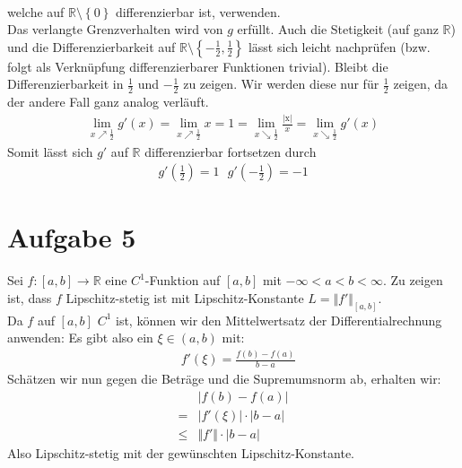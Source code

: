 \documentclass{scrreprt}
\newcommand{\RR}{\mathbb{R}}
\newcommand{\curly}[1]{\left\lbrace#1\right\rbrace}
\newcommand{\abs}[1]{\left\vert#1\right\vert}
\begin{document}
\begin{enumerate}[(a)]
\begin{align*}
    \end{align*}
    welche auf $\RR\setminus\curly{0}$ differenzierbar ist, verwenden.\\
    Das verlangte Grenzverhalten wird von $g$ erfüllt. Auch die Stetigkeit (auf ganz $\RR$) und die Differenzierbarkeit auf $\RR\setminus \curly{-\frac{1}{2}, \frac{1}{2}}$ lässt sich leicht nachprüfen (bzw. folgt als Verknüpfung differenzierbarer Funktionen trivial). Bleibt die Differenzierbarkeit in $\frac{1}{2}$ und $-\frac{1}{2}$ zu zeigen. Wir werden diese nur für $\frac{1}{2}$ zeigen, da der andere Fall ganz analog verläuft.
    \begin{align*}
        \lim\limits_{x \nearrow \frac{1}{2}} g'(x) = \lim\limits_{x \nearrow \frac{1}{2}} x = 1 = \lim\limits_{x \searrow \frac{1}{2}} \frac{\mathrm{\abs{x}}}{x} = \lim\limits_{x \searrow \frac{1}{2}} g'(x)
    \end{align*}
    Somit lässt sich $g'$ auf $\RR$ differenzierbar fortsetzen durch 
    \begin{align*}
        g'(\frac{1}{2}) = 1 ~~~ g'(-\frac{1}{2}) = -1
    \end{align*}
\end{enumerate}

\pagebreak
\section*{Aufgabe 5}
Sei $f \colon [a, b] \to \RR$ eine $C^1$-Funktion auf $[a,b]$ mit $-\infty < a < b < \infty$. Zu zeigen ist, dass $f$ Lipschitz-stetig ist mit Lipschitz-Konstante $L = \Vert f' \Vert_{[a,b]}$.\\
Da $f$ auf $[a,b]$ $C^1$ ist, können wir den Mittelwertsatz der Differentialrechnung anwenden: Es gibt also ein $\xi \in (a,b)$ mit:
\begin{align*}
    &f'(\xi) = \frac{f(b) - f(a)}{b-a}
\end{align*}
Schätzen wir nun gegen die Beträge und die Supremumsnorm ab, erhalten wir:
\begin{align*}
    & \abs{f(b) - f(a)} \\
    = &\abs{f'(\xi)} \cdot \abs{b-a} \\
    \leq & \Vert f' \Vert \cdot \abs{b-a}
\end{align*}
Also Lipschitz-stetig mit der gewünschten Lipschitz-Konstante.
\end{document}
